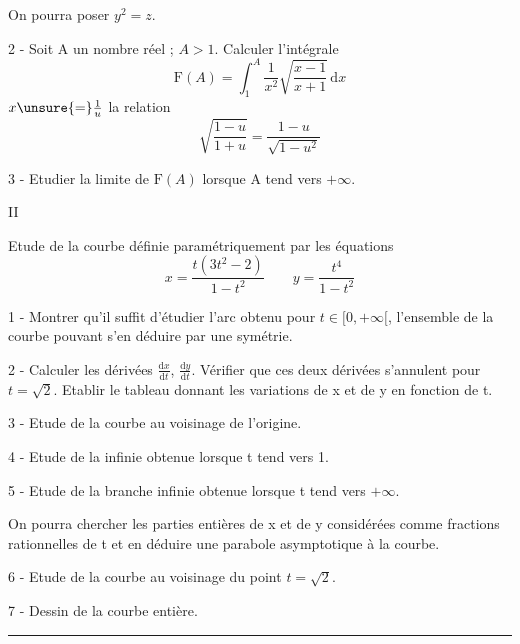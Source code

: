 On pourra poser $y^2=z$.

2 - Soit A un nombre réel ; $A>1$. Calculer l'intégrale
\[
\mathrm F(A)=\int_1^A\frac{1}{x^2}\sqrt{\frac{x-1}{x+1}}\,\mathrm dx
\]
 $x\unsure{=}\frac1u$  la relation
\[
\sqrt{\frac{1-u}{1+u}}=\frac{1-u}{\sqrt{1-u^2}}
\]

3 - Etudier la limite de $\mathrm F(A)$ lorsque A tend vers $+\infty$.

\begin{center}II\end{center}

Etude de la courbe définie paramétriquement par les équations
\[
x=\frac{t(3t^2-2)}{1-t^2}
\qquad
y=\frac{t^4}{1-t^2}
\]

1 - Montrer qu'il suffit d'étudier l'arc obtenu pour $t\in[0,+\infty[$,
l'ensemble de la courbe pouvant s'en déduire par une symétrie.

2 - Calculer les dérivées $\frac{\mathrm dx}{\mathrm dt}$, $\frac{\mathrm dy}{\mathrm dt}$.
Vérifier que ces deux dérivées s'annulent pour $t=\sqrt2$.
Etablir le tableau donnant les variations de x et de y en fonction de t.

3 - Etude de la courbe au voisinage de l'origine.

4 - Etude de la  infinie obtenue lorsque t tend vers 1.

5 - Etude de la branche infinie obtenue lorsque t tend vers $+\infty$.

On pourra chercher les parties entières de x et de y considérées
comme fractions rationnelles de t et en déduire une parabole asymptotique à la
courbe.

6 - Etude de la courbe au voisinage du point $t=\sqrt2$.

7 - Dessin de la courbe entière.

\begin{center}\rule{1.5cm}{.4pt}\end{center}


